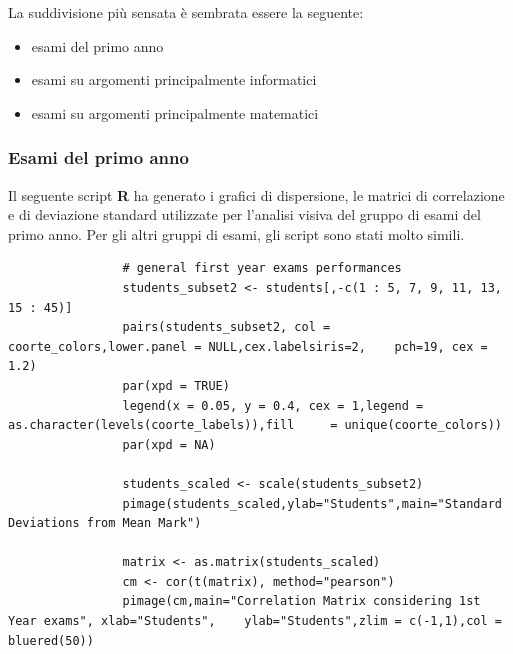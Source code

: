             La suddivisione più sensata è sembrata essere la seguente:

            \begin{itemize}
                \item esami del primo anno
                \item esami su argomenti principalmente informatici
                \item esami su argomenti principalmente matematici
            \end{itemize}

            \subsubsection{Esami del primo anno}

                Il seguente script \textbf{R} ha generato i grafici di dispersione, le matrici di correlazione e di deviazione standard utilizzate per l’analisi visiva del gruppo di esami del primo anno. Per gli altri gruppi di esami, gli script sono stati molto simili.

                \begin{lstlisting}
                # general first year exams performances
                students_subset2 <- students[,-c(1 : 5, 7, 9, 11, 13, 15 : 45)]
                pairs(students_subset2, col = coorte_colors,lower.panel = NULL,cex.labelsiris=2, 	pch=19, cex = 1.2)
                par(xpd = TRUE)
                legend(x = 0.05, y = 0.4, cex = 1,legend = as.character(levels(coorte_labels)),fill 	= unique(coorte_colors))
                par(xpd = NA)
                
                students_scaled <- scale(students_subset2)
                pimage(students_scaled,ylab="Students",main="Standard Deviations from Mean Mark")
                
                matrix <- as.matrix(students_scaled)
                cm <- cor(t(matrix), method="pearson")
                pimage(cm,main="Correlation Matrix considering 1st Year exams", xlab="Students", 	ylab="Students",zlim = c(-1,1),col = bluered(50))
                \end{lstlisting}

